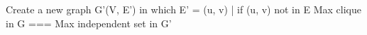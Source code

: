 Create a new graph G'(V, E') in which
E' = {(u, v) | if (u, v) not in E}
Max clique in G === Max independent set in G'
